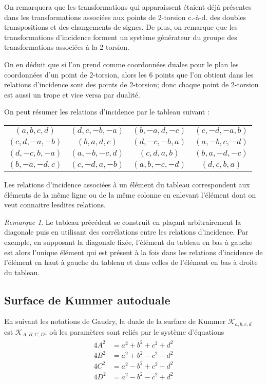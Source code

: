 \documentclass[a4paper,12pt]{article}
\theoremstyle{definition}
\theoremstyle{remark}
\newtheorem{remarque}{Remarque}
\numberwithin{equation}{section}
\begin{document}
On remarquera que les transformations qui apparaissent étaient déjà présentes dans les transformations associées aux points de 2-torsion c.-à-d. des doubles transpositions et des changements de signes. De plus, on remarque que les transformations d'incidence forment un système générateur du groupe des transformations associées à la 2-torsion.

On en déduit que si l'on prend comme coordonnées duales pour le plan les coordonnées d'un point de 2-torsion, alors les 6 points que l'on obtient dans les relations d'incidence sont des points de 2-torsion; donc chaque point de 2-torsion est aussi un trope et vice versa par dualité.

On peut résumer les relations d'incidence par le tableau suivant :
\begin{center}
\begin{tabular}{ c c c c }
   $(a,b,c,d)$   & $(d,c,-b,-a)$ & $(b,-a,d,-c)$ & $(c,-d,-a,b)$ \\
   $(c,d,-a,-b)$ & $(b,a,d,c)$ & $(d,-c,-b,a)$ & $(a,-b,c,-d)$ \\
   $(d,-c,b,-a)$ & $(a,-b,-c,d)$ & $(c,d,a,b)$ & $(b,a,-d,-c)$ \\
   $(b,-a,-d,c)$ &  $(c,-d,a,-b)$ & $(a,b,-c,-d)$ & $(d, c, b, a)$
 \end{tabular}
\end{center}

Les relations d'incidence associées à un élément du tableau correspondent aux éléments de la même ligne ou de la même colonne en enlevant l'élément dont on veut connaitre lesdites relations.

\begin{remarque}
Le tableau précédent se construit en plaçant arbitrairement la diagonale puis en utilisant des corrélations entre les relations d'incidence. Par exemple, en supposant la diagonale fixée, l'élément du tableau en bas à gauche est alors l'unique élément qui est présent à la fois dans les relations d'incidence de l'élément en haut à gauche du tableau et dans celles de l'élément en bas à droite du tableau.
\end{remarque}

\subsection{Surface de Kummer autoduale}

En suivant les notations de Gaudry, la duale de la surface de Kummer $\mathcal{K}_{a,b,c,d}$ est $\mathcal{K}_{A,B,C,D}$; où les paramètres sont reliés par le système d'équations \citep{gaudry}
\begin{align}
\begin{split}
\label{constDual}
4A^2 &= a^2 + b^2 + c^2 + d^2 \\
4B^2 &= a^2 + b^2 - c^2 - d^2 \\
4C^2 &= a^2 - b^2 + c^2 - d^2 \\
4D^2 &= a^2 - b^2 - c^2 + d^2
\end{split}
\end{align}
\end{document}

